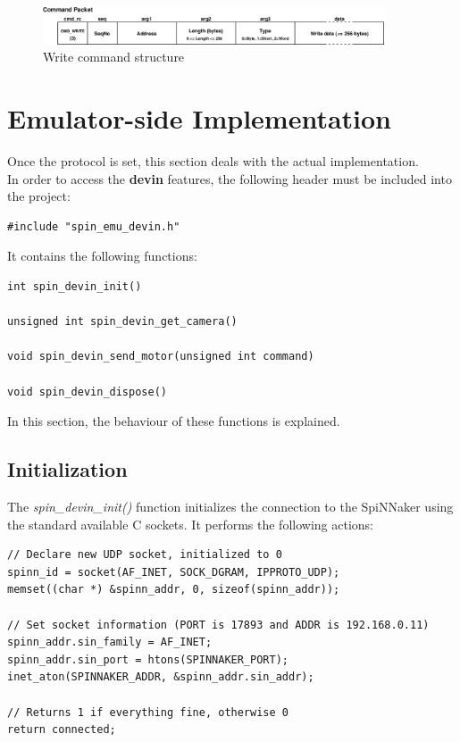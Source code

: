 \documentclass{article}
\begin{document}
\begin{figure}[h]
\begin{center}
\includegraphics[width=0.9\textwidth]{write}
\caption{Write command structure}
\label{fig:write}
\end{center}
\end{figure}

\section{Emulator-side Implementation}
Once the protocol is set, this section deals with the actual implementation.\\

In order to access the \textbf{devin} features, the following header must be included into the project:
\begin{verbatim}
#include "spin_emu_devin.h"
\end{verbatim}
It contains the following functions:
\begin{verbatim}
int spin_devin_init()

unsigned int spin_devin_get_camera()

void spin_devin_send_motor(unsigned int command)

void spin_devin_dispose()
\end{verbatim}

In this section, the behaviour of these functions is explained.

\subsection{Initialization}
The \textit{spin\_devin\_init()} function initializes the connection to the SpiNNaker using the standard available C sockets. It performs the following actions:
\begin{verbatim}
// Declare new UDP socket, initialized to 0
spinn_id = socket(AF_INET, SOCK_DGRAM, IPPROTO_UDP);
memset((char *) &spinn_addr, 0, sizeof(spinn_addr));

// Set socket information (PORT is 17893 and ADDR is 192.168.0.11)
spinn_addr.sin_family = AF_INET;
spinn_addr.sin_port = htons(SPINNAKER_PORT);
inet_aton(SPINNAKER_ADDR, &spinn_addr.sin_addr);

// Returns 1 if everything fine, otherwise 0
return connected;
\end{verbatim}
\end{document}
